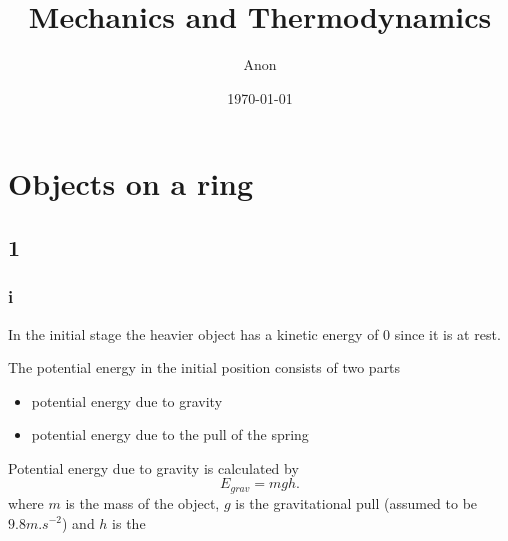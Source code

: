 \documentclass[12pt,a4paper]{article}
\title{Mechanics and Thermodynamics}
\author{Anon}
\date{\today}
\begin{document}
\maketitle
\section{Objects on a ring}

\subsection{1}

\subsubsection{i}

In the initial stage the heavier object has a kinetic energy of 0 since it is at rest.

The potential energy in the initial position consists of two parts

\begin{itemize}
	\item potential energy due to gravity
	\item potential energy due to the pull of the spring

\end{itemize}


Potential energy due to gravity is calculated by \[
	E_{grav}=mgh
.\] 
where $m$ is the mass of the object,  $g$ is the gravitational pull (assumed to be $9.8\unit{m.s^{-2}}$) and $h$ is the
\end{document}
